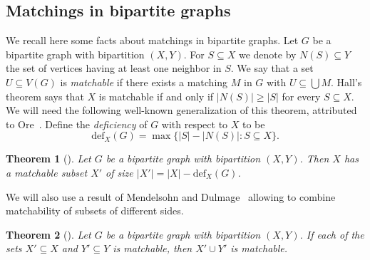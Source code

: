 \documentclass[10pt,a4paper]{amsart}
\newtheorem{theorem}{Theorem}[section]
\begin{document}
\subsection{Matchings in bipartite graphs}
We recall here some facts about matchings in bipartite graphs. Let $G$ be a bipartite graph with bipartition $(X, Y)$. For $S \subseteq X$ we denote by $N(S) \subseteq Y$ the set of vertices having at least one neighbor in $S$. We say that a set $U \subseteq V(G)$ is \emph{matchable} if there exists a matching $M$ in $G$ with $U \subseteq \bigcup M$. Hall's theorem says that $X$ is matchable if and only if $|N(S)| \ge |S|$ for every $S \subseteq X$. We will need the following well-known generalization of this theorem, attributed to Ore~\cite{Ore}. Define the \emph{deficiency} of $G$ with respect to $X$ to be \[ \mathrm{def}_X(G) = \max \{|S| - |N(S)|: S \subseteq X\}.\]
\begin{theorem}[{\cite{Ore}}] \label{thm:DEF}
Let $G$ be a bipartite graph with bipartition $(X, Y)$. Then $X$ has a matchable subset $X'$ of size $|X'| = |X| - \mathrm{def}_X(G)$.
\end{theorem}
We will also use a result of Mendelsohn and Dulmage~\cite{MD} allowing to combine matchability of subsets of different sides.
\begin{theorem}[{\cite{MD}}] \label{thm:MD}
Let $G$ be a bipartite graph with bipartition $(X, Y)$. If each of the sets $X' \subseteq X$ and $Y' \subseteq Y$ is matchable, then $X' \cup Y'$ is matchable.
\end{theorem}
\end{document}
